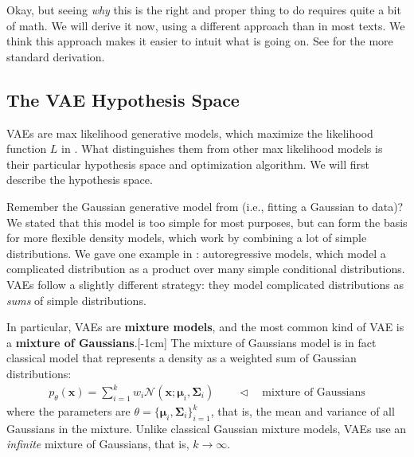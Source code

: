 Okay, but seeing \textit{why} this is the right and proper thing to do requires quite a bit of math. We will derive it now, using a different approach than in most texts. We think this approach makes it easier to intuit what is going on. See \cite{kingma2019introduction} for the more standard derivation.

\subsection{The VAE Hypothesis Space}

VAEs are max likelihood generative models, which maximize the likelihood function $L$ in \eqn{\ref{eqn:generative_modeling_and_representation_learning:marginal_likelihood_p}}. What distinguishes them from other max likelihood models is their particular hypothesis space and optimization algorithm. We will first describe the hypothesis space.

Remember the Gaussian generative model from \chap{\ref{chapter:generative_models}} (i.e., fitting a Gaussian to data)? We stated that this model is too simple for most purposes, but can form the basis for more flexible density models, which work by combining a lot of simple distributions. We gave one example in \chap{\ref{chapter:generative_models}}: autoregressive models, which model a complicated distribution as a product over many simple conditional distributions. VAEs follow a slightly different strategy: they model complicated distributions as \textit{sums} of simple distributions.

In particular, VAEs are \textbf{mixture models}, and the most common kind of VAE is a \textbf{mixture of Gaussians}.[-1cm] The mixture of Gaussians model is in fact classical model that represents a density as a weighted sum of Gaussian distributions:
\begin{align}
    p_{\theta}(\mathbf{x}) = \sum_{i=1}^k w_i \mathcal{N}(\mathbf{x}; \mathbf{\mu}_i, \mathbf{\Sigma}_i) \quad\quad \triangleleft \quad\text{mixture of Gaussians}
\end{align}
where the parameters are $\theta = \{\mathbf{\mu}_i, \mathbf{\Sigma}_i\}_{i=1}^k$, that is, the mean and variance of all Gaussians in the mixture. Unlike classical Gaussian mixture models, VAEs use an \textit{infinite} mixture of Gaussians, that is, $k \rightarrow \infty$.

